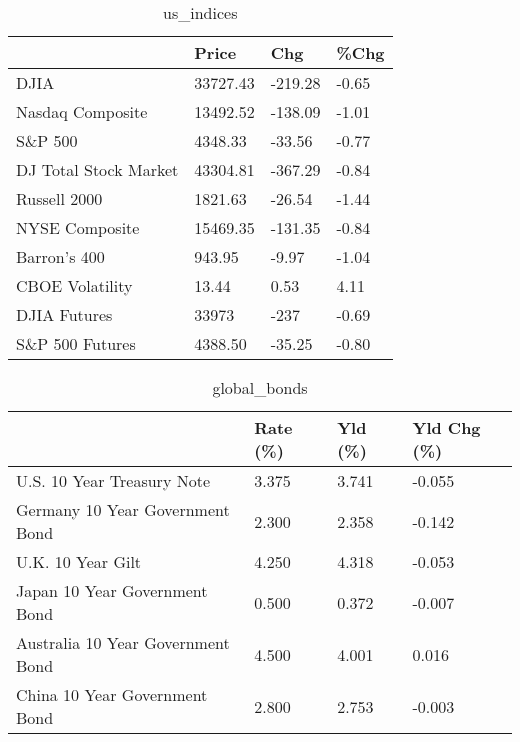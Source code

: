 \documentclass{article}%
\begin{document}
%


\begin{table}[htbp]%
\caption{us\_indices}%
\centering%
\begin{adjustbox}{width=1\textwidth}%
\begin{tabular}{llll}
\toprule
                      &    Price &     Chg &  \%Chg \\
\midrule
                 DJIA & 33727.43 & -219.28 & -0.65 \\
     Nasdaq Composite & 13492.52 & -138.09 & -1.01 \\
              S\&P 500 &  4348.33 &  -33.56 & -0.77 \\
DJ Total Stock Market & 43304.81 & -367.29 & -0.84 \\
         Russell 2000 &  1821.63 &  -26.54 & -1.44 \\
       NYSE Composite & 15469.35 & -131.35 & -0.84 \\
         Barron's 400 &   943.95 &   -9.97 & -1.04 \\
      CBOE Volatility &    13.44 &    0.53 &  4.11 \\
         DJIA Futures &    33973 &    -237 & -0.69 \\
      S\&P 500 Futures &  4388.50 &  -35.25 & -0.80 \\
\bottomrule
\end{tabular}
%
\end{adjustbox}%
\end{table}

%


\begin{table}[htbp]%
\caption{global\_bonds}%
\centering%
\begin{adjustbox}{width=1\textwidth}%
\begin{tabular}{llll}
\toprule
                                  & Rate (\%) & Yld (\%) & Yld Chg (\%) \\
\midrule
       U.S. 10 Year Treasury Note &    3.375 &   3.741 &      -0.055 \\
  Germany 10 Year Government Bond &    2.300 &   2.358 &      -0.142 \\
                U.K. 10 Year Gilt &    4.250 &   4.318 &      -0.053 \\
    Japan 10 Year Government Bond &    0.500 &   0.372 &      -0.007 \\
Australia 10 Year Government Bond &    4.500 &   4.001 &       0.016 \\
    China 10 Year Government Bond &    2.800 &   2.753 &      -0.003 \\
\bottomrule
\end{tabular}
%
\end{adjustbox}%
\end{table}
\end{document}
